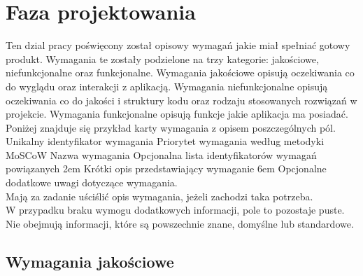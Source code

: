 \newcommand{\tabeladwiekolumnywiersz}[2]{
    \parbox[c][1em][c]{\textwidth}{
        #1
    } &
    \parbox[c][2.5em][c]{\textwidth}{
        #2
    }
    \\
    \hline
}

\newcommand{\tabeladwiekolumny}[3]{
    \begin{center}
        \begin{tabularx}{1\textwidth} {
                | >{\hsize=#1\hsize}X
                | >{\hsize=#2\hsize}X |}
            \hline

            #3
        \end{tabularx}
    \end{center}
}

\newcommand{\tabeladwiekolumnywykres}[3]{
    \tabeladwiekolumnywiersz{
        #1
    }{
        \rule{30.3em / #3 * #2}{1.2em}
    }
}

\section{Faza projektowania}
Ten dzial pracy poświęcony został opisowy wymagań jakie miał spełniać gotowy produkt. Wymagania te zostały podzielone na trzy kategorie: jakościowe, niefunkcjonalne oraz funkcjonalne. Wymagania jakościowe opisują oczekiwania co do wyglądu oraz interakcji z aplikacją. Wymagania niefunkcjonalne opisują oczekiwania co do jakości i struktury kodu oraz rodzaju stosowanych rozwiązań w projekcie. Wymagania funkcjonalne opisują funkcje jakie aplikacja ma posiadać.\\

Poniżej znajduje się przykład karty wymagania z opisem poszczególnych pól.
\wymaganie
{Unikalny identyfikator wymagania}
{Priorytet wymagania według metodyki MoSCoW}
{Nazwa wymagania}
{Opcjonalna lista identyfikatorów wymagań powiązanych}
{2em}{
    Krótki opis przedstawiający wymaganie
}
{6em}{
    Opcjonalne dodatkowe uwagi dotyczące wymagania.\\
    Mają za zadanie uściślić opis wymagania, jeżeli zachodzi taka potrzeba.\\
    W przypadku braku wymogu dodatkowych informacji, pole to pozostaje puste.\\
    Nie obejmują informacji, które są powszechnie znane, domyślne lub standardowe.
}

\subsection{Wymagania jakościowe}


